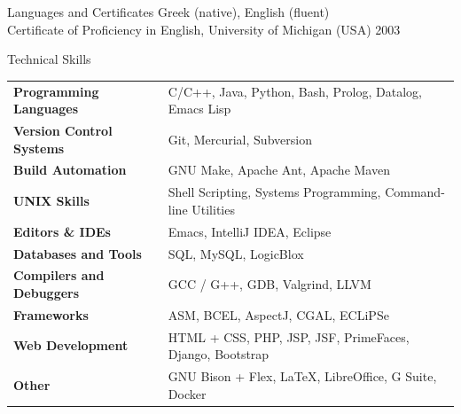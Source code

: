 \documentclass{resume}
\begin{document}
\begin{rSection}{Languages and Certificates}
  Greek (native), English (fluent) \\
  Certificate of Proficiency in English, University of Michigan (USA)
  \hfill 2003
\end{rSection}

\newpage


\begin{rSection}{Technical Skills}

{\renewcommand{\arraystretch}{1.3}
\begin{tabular}{ @{} >{\bfseries}l @{\hspace{6ex}} l }

Programming Languages
   & C/C++, Java, Python, Bash, Prolog, Datalog, Emacs Lisp \\

Version Control Systems
   & Git, Mercurial, Subversion \\

Build Automation
   & GNU Make, Apache Ant, Apache Maven \\

UNIX Skills
   & Shell Scripting, Systems Programming, Command-line Utilities \\

Editors \& IDEs
   & Emacs, IntelliJ IDEA, Eclipse \\

Databases and Tools
   & SQL, MySQL, LogicBlox \\

Compilers and Debuggers
   & GCC / G++, GDB, Valgrind, LLVM \\


Frameworks
   & ASM, BCEL, AspectJ, CGAL, ECLiPSe \\

Web Development
   & HTML + CSS, PHP, JSP, JSF, PrimeFaces, Django, Bootstrap \\

Other
   & GNU Bison + Flex, \LaTeX{}, LibreOffice, G Suite, Docker \\
\end{tabular}}
\end{rSection}
\end{document}
